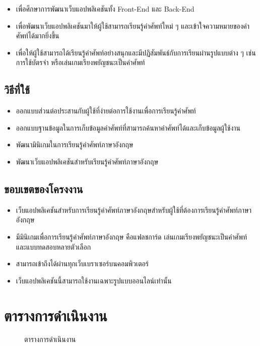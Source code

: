 \documentclass[12pt,oneside,openright,a4paper]{cpe-thai-project}
\begin{document}
\begin{itemize}
	\item เพื่อศึกษาการพัฒนาเว็บแอปพลิเคชันทั้ง Front-End และ Back-End
	\item เพื่อพัฒนาเว็บแอปพลิเคชันมาให้ผู้ใช้สามารถเรียนรู้คำศัพท์ใหม่ ๆ และเข้าใจความหมายของคำศัพท์ได้มากยิ่งขึ้น
	\item เพื่อให้ผู้ใช้สามารถได้เรียนรู้คำศัพท์อย่างสนุกและมีปฏิสัมพันธ์กับการเรียนผ่านรูปแบบต่าง ๆ เช่นการใช้บัตรจำ หรือเล่นเกมเรียงพยัญชนะเป็นคำศัพท์
\end{itemize}

\subsection{วิธีที่ใช้}

\begin{itemize}
	\item  ออกแบบส่วนต่อประสานกับผู้ใช้ที่ง่ายต่อการใช้งานเพื่อการเรียนรู้คำศัพท์
	\item  ออกแบบฐานข้อมูลในการเก็บข้อมูลคำศัพท์ที่สามารถค้นหาคำศัพท์ได้และเก็บข้อมูลผู้ใช้งาน
	\item  พัฒนามินิเกมในการเรียนรู้คำศัพท์ภาษาอังกฤษ
	\item  พัฒนาเว็บแอปพลิเคชันสำหรับเรียนรู้คำศัพท์ภาษาอังกฤษ
\end{itemize}

\subsection{ขอบเขตของโครงงาน}

\begin{itemize}
	\item  เว็บแอปพลิเคชันสำหรับการเรียนรู้คำศัพท์ภาษาอังกฤษสำหรับผู้ใช้ที่ต้องการเรียนรู้คำศัพท์ภาษาอังกฤษ
	\item  มีมินิเกมเพื่อการเรียนรู้คำศัพท์ภาษาอังกฤษ คือแฟลชการ์ด เล่นเกมเรียงพยัญชนะเป็นคำศัพท์ และแบบทดสอบหลายตัวเลือก
	\item  สามารถเข้าถึงได้ผ่านทุกเว็บเบราเซอร์บนคอมพิวเตอร์
	\item  เว็บแอปพลิเคชันนี้สามารถใช้งานเฉพาะรูปแบบออนไลน์เท่านั้น
\end{itemize}

\section{ตารางการดำเนินงาน}

\begin{figure}[!h]\centering
	\caption{ตารางการดำเนินงาน}\label{fig:plan}
\end{figure}
\end{document}
